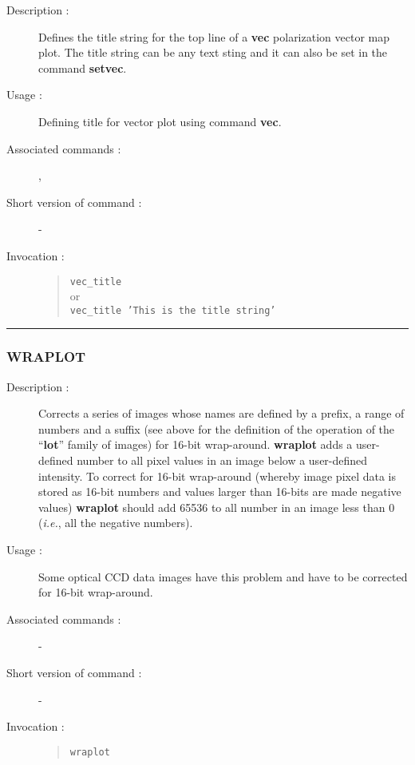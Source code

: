 \begin{description}

\item[Description :] Defines the title string for the top line of a {\bf vec}
polarization vector map plot.  The title string can be any text sting
and it can also be set in the command {\bf setvec}.

\item[Usage :] Defining title for vector plot using command {\bf vec}.
\item[Associated commands :] {\tt {}},
{\tt {}}
\item[Short version of command :] -
\item[Invocation :]

\begin{quote}{\tt  vec\_title }\\
or \\
{\tt vec\_title 'This is the title string' }
\end{quote}

\end{description}

\hrule
\subsubsection*{\label{WRAPLOT}WRAPLOT}

\begin{description}

\item[Description :] Corrects a series of images whose names are
defined by a prefix, a range of numbers and a suffix (see above for the
definition of the operation of the ``{\bf lot}'' family of images) for
16-bit wrap-around.  {\bf wraplot} adds a user-defined number to all pixel
values in an image below a user-defined intensity.  To correct for
16-bit wrap-around (whereby image pixel data is stored as 16-bit
numbers and values larger than 16-bits are made negative values)
{\bf wraplot} should add 65536 to all number in an image less than 0
(\emph{i.e.}, all the negative numbers).

\item[Usage :] Some optical CCD data images have this problem and have to be
corrected for 16-bit wrap-around.
\item[Associated commands :] -
\item[Short version of command :] -
\item[Invocation :]

\begin{quote}{\tt  wraplot }\end{quote}

\end{description}

